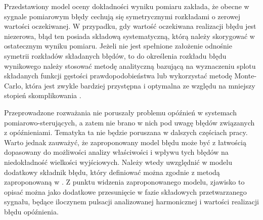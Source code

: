 Przedstawiony model oceny dokładności wyniku pomiaru zakłada, że obecne w sygnale pomiarowym błędy cechują się symetrycznymi rozkładami o zerowej wartości oczekiwanej. W przypadku, gdy wartość oczekiwana realizacji błędu jest niezerowa, błąd ten posiada składową systematyczną, którą należy skorygować w ostatecznym wyniku pomiaru. Jeżeli nie jest spełnione założenie odnośnie symetrii rozkładów składanych błędów, to do określenia rozkładu błędu wynikowego należy stosować metodę analityczną bazującą na wyznaczeniu splotu składanych funkcji gęstości prawdopodobieństwa lub wykorzystać metodę Monte-Carlo, która jest zwykle bardziej przystępna i optymalna ze względu na mniejszy stopień skomplikowania \cite{janssen_montecarlo, roj_annuncertainty}.

Przeprowadzone rozważania nie poruszały problemu opóźnień w systemach pomiarowo-sterujących, a zatem nie brano w nich pod uwagę błędów związanych z opóźnieniami. Tematyka ta nie będzie poruszana w dalszych częściach pracy. Warto jednak zauważyć, że zaproponowany model błędu może być z łatwością dopasowany do możliwości analizy właściwości i wpływu tych błędów na niedokładność wielkości wyjściowych. Należy wtedy uwzględnić w modelu dodatkowy składnik błędu, który definiować można zgodnie z metodą zaproponowaną w \cite{wymyslo_delay, jakubiec_system}. Z punktu widzenia zaproponowanego modelu, zjawisko to opisać można jako dodatkowe przesunięcie w fazie składowych przetwarzanego sygnału, będące iloczynem pulsacji analizowanej harmonicznej i wartości realizacji błędu opóźnienia.

